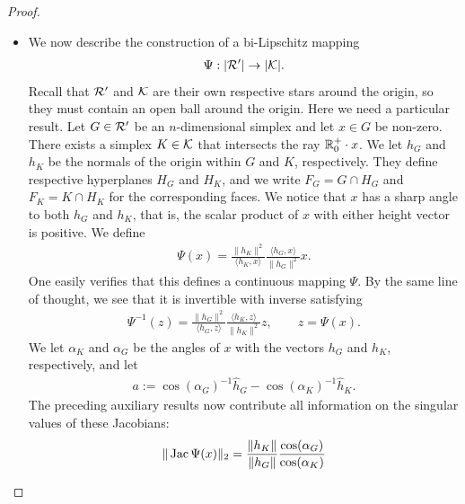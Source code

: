 \documentclass[10pt,a4paper]{article}
\newcommand{\mwl}[1]{{\color{red}#1}}
\begin{document}
\begin{proof}
\begin{itemize}
        \item 
        We now describe the construction of a bi-Lipschitz mapping 
        \begin{align*}
            \Psi : |{\mathcal R}'| \rightarrow |{\mathcal K}|.
        \end{align*}
		Recall that ${\mathcal R}'$ and ${\mathcal K}$ are their own respective stars around the origin,
		so they must contain an open ball around the origin. 
		\mwl{Here we need a particular result. }
		Let ${G} \in {\mathcal R}'$ be an $n$-dimensional simplex and let $x \in {G}$ be non-zero. There exists a simplex $K \in {\mathcal K}$ that intersects the ray ${\mathbb R}_0^+ \cdot x$. We let $h_{{G}}$ and $h_{K}$ be the normals of the origin within ${G}$ and $K$, respectively. They define respective hyperplanes $H_{G}$ and $H_{K}$,
        and we write $F_{G} = G \cap H_{G}$ and $F_{K} = K \cap H_{K}$ for the corresponding faces. 
        We notice that $x$ has a sharp angle to both $h_{{G}}$ and $h_{K}$,
        that is, the scalar product of $x$ with either height vector is positive. 
        We define 
        \begin{align*}
            \Psi(x) 
            = 
            \frac{ \| h_K \|^{2} }{ \langle h_K, x \rangle }
            \frac{ \langle h_{{G}}, x \rangle }{ \| h_{{G}} \|^{2} }
            x
            .
        \end{align*}
        One easily verifies that this defines a continuous mapping $\Psi$. 
        By the same line of thought, we see that it is invertible with inverse satisfying 
        \begin{align*}
            \Psi^{-1}(z) 
            = 
            \frac{ \| h_{{G}} \|^{2} }{ \langle h_{{G}}, z \rangle }
            \frac{ \langle h_K, z \rangle }{ \| h_K \|^{2} }
            z,
            \qquad 
            z = \Psi(x)
            .
        \end{align*}
        We let $\alpha_K$ and $\alpha_{{G}}$ be the angles of $x$ with the vectors $h_{{G}}$ and $h_{K}$, respectively,
        and let 
        \begin{align*}
            a := \cos(\alpha_{{G}})^{-1} \hat h_{{G}} - \cos(\alpha_K)^{-1} \hat h_K
            .
        \end{align*}
        The preceding auxiliary results now contribute all information on the singular values of these Jacobians:
        \begin{gather*}
            \matnorm{ \Jacobian\Psi(x) }
            = 
            \frac{ \| h_K \| }{ \| h_{{G}} \| }
            \frac{ \cos(\alpha_{{G}}) }{ \cos(\alpha_K) }

\end{gather*}
\end{itemize}
\end{proof}
\end{document}
